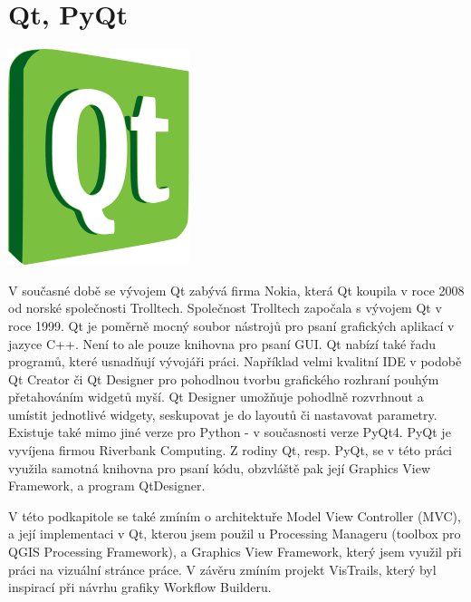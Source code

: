 \newpage
\section{Qt, PyQt}
\nocite{pyqt:www}

\begin{center}
	\includegraphics[scale=0.3]{pictures/qt_logo}
\end{center}

V současné době se vývojem Qt zabývá firma Nokia, která Qt koupila v roce 2008 od norské společnosti Trolltech. Společnost Trolltech započala s vývojem Qt v roce 1999. Qt je poměrně mocný soubor nástrojů pro psaní grafických aplikací v jazyce C++. Není to ale pouze knihovna pro psaní GUI. Qt nabízí také řadu programů, které usnadňují vývojáři práci. Například velmi kvalitní IDE v podobě Qt Creator či Qt Designer pro pohodlnou tvorbu grafického rozhraní pouhým přetahováním widgetů myší. Qt Designer umožňuje pohodlně rozvrhnout a umístit jednotlivé widgety, seskupovat je do layoutů či nastavovat parametry. \\
\indent Existuje také mimo jiné verze pro Python - v současnosti verze PyQt4. PyQt je vyvíjena firmou Riverbank Computing. Z rodiny Qt, resp. PyQt, se v této práci využila samotná knihovna pro psaní kódu, obzvláště pak její Graphics View Framework, a program QtDesigner.

V této podkapitole se také zmíním o architektuře Model View Controller (MVC), a její implementaci v Qt, kterou jsem použil u Processing Manageru (toolbox pro QGIS Processing Framework), a Graphics View Framework, který jsem využil při práci na vizuální stránce práce. V závěru zmíním projekt VisTrails, který byl inspirací při návrhu grafiky Workflow Builderu. 

